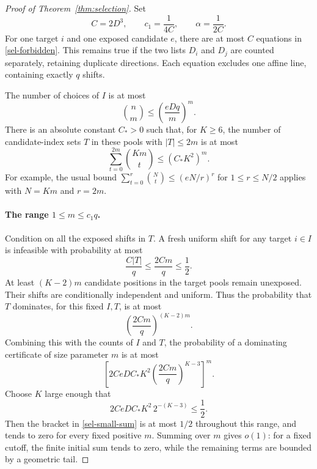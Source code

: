 \begin{proof}[Proof of Theorem~\ref{thm:selection}]
Set
\begin{equation}\label{sel-constants}
 C=2D^3,\qquad c_1=\frac1{4C},\qquad \alpha=\frac1{2C}.
\end{equation}
For one target $i$ and one exposed candidate $e$, there are at most $C$
equations in \eqref{sel-forbidden}.  This remains true if the two lists
$D_i$ and $D_j$ are counted separately, retaining duplicate directions.
Each equation excludes one affine line, containing exactly $q$ shifts.

The number of choices of $I$ is at most
\[
 \binom{n}{m}\le\left(\frac{eDq}{m}\right)^m.
\]
There is an absolute constant $C_*>0$ such that, for $K\ge6$, the number
of candidate-index sets $T$ in these pools with $|T|\le2m$ is at most
\begin{equation}\label{sel-certificate-count}
 \sum_{t=0}^{2m}\binom{Km}{t}\le (C_*K^2)^m.
\end{equation}
For example, the usual bound
$\sum_{t=0}^{r}\binom Nt\le(eN/r)^r$ for $1\le r\le N/2$
applies with $N=Km$ and $r=2m$.

\paragraph{The range $1\le m\le c_1q$.}
Condition on all the exposed shifts in $T$.  A fresh uniform shift for
any target $i\in I$ is infeasible with probability at most
\[
 \frac{C|T|}{q}\le\frac{2Cm}{q}\le\frac12.
\]
At least $(K-2)m$ candidate positions in the target pools remain
unexposed.  Their shifts are conditionally independent and uniform.
Thus the probability that $T$ dominates, for this fixed $I,T$, is at most
\begin{equation}\label{sel-small-probability}
 \left(\frac{2Cm}{q}\right)^{(K-2)m}.
\end{equation}
Combining this with the counts of $I$ and $T$, the probability of a
dominating certificate of size parameter $m$ is at most
\begin{equation}\label{sel-small-sum}
 \left[
  2CeD C_*K^2
  \left(\frac{2Cm}{q}\right)^{K-3}
 \right]^m.
\end{equation}
Choose $K$ large enough that
\begin{equation}\label{sel-small-K}
 2CeD C_*K^2\,2^{-(K-3)}\le\frac12.
\end{equation}
Then the bracket in \eqref{sel-small-sum} is at most $1/2$ throughout
this range, and tends to zero for every fixed positive $m$.  Summing
over $m$ gives $o(1)$: for a fixed cutoff, the finite initial sum tends
to zero, while the remaining terms are bounded by a geometric tail.


\end{proof}
